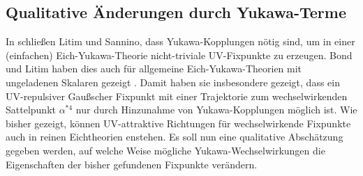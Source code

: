     
  \subsection{Qualitative Änderungen durch Yukawa-Terme}
    
    In \cite{Asymptotic_safety_guaranteed} schließen Litim und Sannino, dass 
    Yukawa-Kopplungen nötig sind, um in einer (einfachen) Eich-Yukawa-Theorie 
    nicht-triviale UV-Fixpunkte zu erzeugen. Bond und Litim haben 
    dies auch für allgemeine Eich-Yukawa-Theorien mit 
    ungeladenen Skalaren gezeigt \cite{Bond_Litim}. Damit haben sie 
    insbesondere gezeigt, dass ein UV-repulsiver Gaußscher Fixpunkt mit 
    einer Trajektorie zum wechselwirkenden Sattelpunkt $\alpha^{*4}$ nur durch 
    Hinzunahme von Yukawa-Kopplungen möglich ist. Wie bisher gezeigt, können 
    UV-attraktive Richtungen für wechselwirkende Fixpunkte auch in 
    reinen Eichtheorien enstehen. Es soll nun eine qualitative Abschätzung 
    gegeben werden, auf welche Weise mögliche Yukawa-Wechselwirkungen die 
    Eigenschaften der bisher gefundenen Fixpunkte verändern.
    
